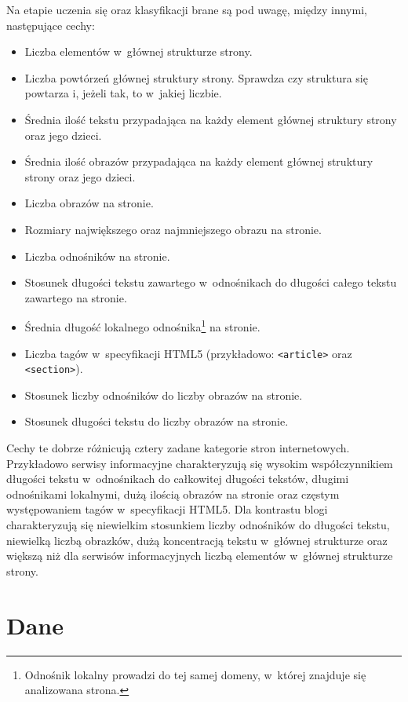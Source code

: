 \documentclass[a4paper,11pt]{article}
\begin{document}
Na etapie uczenia się oraz klasyfikacji brane są pod uwagę, między innymi, następujące cechy:

\begin{itemize}
    \item Liczba elementów w~głównej strukturze strony.
    \item Liczba powtórzeń głównej struktury strony. Sprawdza czy struktura się powtarza i, jeżeli tak, to w~jakiej liczbie.
    \item Średnia ilość tekstu przypadająca na każdy element głównej struktury strony oraz jego dzieci. 
    \item Średnia ilość obrazów przypadająca na każdy element głównej struktury strony oraz jego dzieci.
    \item Liczba obrazów na stronie.
    \item Rozmiary największego oraz najmniejszego obrazu na stronie.
    \item Liczba odnośników na stronie.
    \item Stosunek długości tekstu zawartego w~odnośnikach do długości całego tekstu zawartego na stronie.
    \item Średnia długość lokalnego odnośnika\footnote{Odnośnik lokalny prowadzi do tej samej domeny, w~której znajduje się analizowana strona.} na stronie.
    \item Liczba tagów w~specyfikacji HTML5 (przykładowo: \verb+<article>+ oraz \verb+<section>+).
    \item Stosunek liczby odnośników do liczby obrazów na stronie.
    \item Stosunek długości tekstu do liczby obrazów na stronie.
\end{itemize}

Cechy te dobrze różnicują cztery zadane kategorie stron internetowych. Przykładowo serwisy informacyjne charakteryzują się wysokim współczynnikiem długości tekstu w~odnośnikach do całkowitej długości tekstów, długimi odnośnikami lokalnymi, dużą ilością obrazów na stronie oraz częstym występowaniem tagów w~specyfikacji HTML5. Dla kontrastu blogi charakteryzują się niewielkim stosunkiem liczby odnośników do długości tekstu, niewielką liczbą obrazków, dużą koncentracją tekstu w~głównej strukturze oraz większą niż dla serwisów informacyjnych liczbą elementów w~głównej strukturze strony.

\section{Dane}
\end{document}
